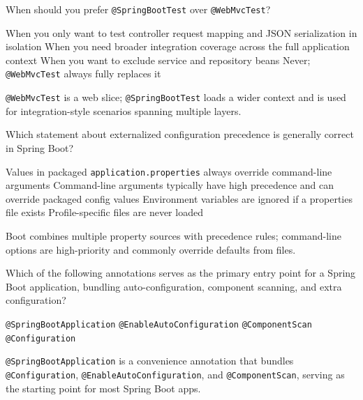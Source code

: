 \question[4]
When should you prefer \texttt{@SpringBootTest} over \texttt{@WebMvcTest}?
\begin{choices}
  \choice When you only want to test controller request mapping and JSON serialization in isolation
  \CorrectChoice When you need broader integration coverage across the full application context
  \choice When you want to exclude service and repository beans
  \choice Never; \texttt{@WebMvcTest} always fully replaces it
\end{choices}
\begin{solution}
  \texttt{@WebMvcTest} is a web slice; \texttt{@SpringBootTest} loads a wider context and is used for integration-style scenarios spanning multiple layers.
\end{solution}

\question[4]
Which statement about externalized configuration precedence is generally correct in Spring Boot?
\begin{choices}
  \choice Values in packaged \texttt{application.properties} always override command-line arguments
  \CorrectChoice Command-line arguments typically have high precedence and can override packaged config values
  \choice Environment variables are ignored if a properties file exists
  \choice Profile-specific files are never loaded
\end{choices}
\begin{solution}
  Boot combines multiple property sources with precedence rules; command-line options are high-priority and commonly override defaults from files.
\end{solution}


\question[4]
Which of the following annotations serves as the primary entry point for a Spring Boot application, bundling auto-configuration, component scanning, and extra configuration?
\begin{choices}
  \CorrectChoice \texttt{@SpringBootApplication}
  \choice \texttt{@EnableAutoConfiguration}
  \choice \texttt{@ComponentScan}
  \choice \texttt{@Configuration}
\end{choices}
\begin{solution}
  \texttt{@SpringBootApplication} is a convenience annotation that bundles \texttt{@Configuration}, \texttt{@EnableAutoConfiguration}, and \texttt{@ComponentScan}, serving as the starting point for most Spring Boot apps.
\end{solution}

